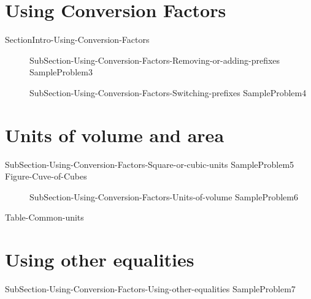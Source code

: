 \documentclass[main.tex]{subfiles}
\newcommand\chapterlabel{Ch-measurements}\setcounter{figurenewcounter}{0}\setcounter{tablenewcounter}{0}\setcounter{formulanewcounter}{0}\chapterpicture{../{\chapterlabel}/figure1}\chapterpicturelabel{PngImg}
\begin{document}
\section{Using Conversion Factors}
{SectionIntro-Using-Conversion-Factors}
\sloppy\begin{description}
\item[]{SubSection-Using-Conversion-Factors-Removing-or-adding-prefixes}
{SampleProblem3}
\item[]{SubSection-Using-Conversion-Factors-Switching-prefixes}
{SampleProblem4}

\end{description}

\section{Units of volume and area}
{SubSection-Using-Conversion-Factors-Square-or-cubic-units}
{SampleProblem5}
{Figure-Cuve-of-Cubes}
\sloppy\begin{description}

\item[]{SubSection-Using-Conversion-Factors-Units-of-volume}
{SampleProblem6}
\end{description}

{Table-Common-units}
\section{Using other equalities}
{SubSection-Using-Conversion-Factors-Using-other-equalities}
{SampleProblem7}
\end{document}
